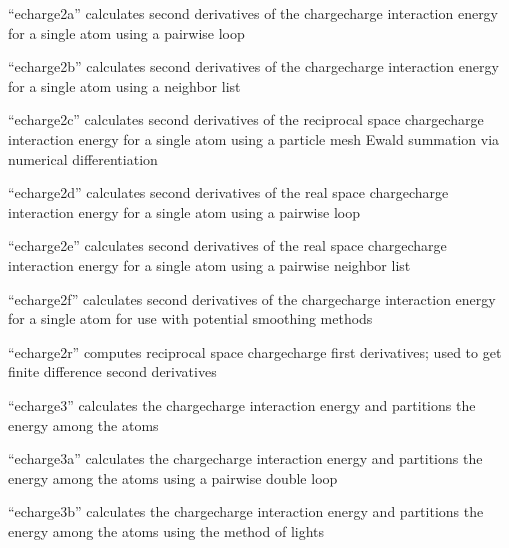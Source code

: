 \documentclass[letterpaper,11pt,english]{sphinxmanual}
\begin{document}
“echarge2a” calculates second derivatives of the charge\sphinxhyphen{}charge
interaction energy for a single atom using a pairwise loop


“echarge2b” calculates second derivatives of the charge\sphinxhyphen{}charge
interaction energy for a single atom using a neighbor list


“echarge2c” calculates second derivatives of the reciprocal
space charge\sphinxhyphen{}charge interaction energy for a single atom using
a particle mesh Ewald summation via numerical differentiation


“echarge2d” calculates second derivatives of the real space
charge\sphinxhyphen{}charge interaction energy for a single atom using a
pairwise loop


“echarge2e” calculates second derivatives of the real space
charge\sphinxhyphen{}charge interaction energy for a single atom using a
pairwise neighbor list


“echarge2f” calculates second derivatives of the charge\sphinxhyphen{}charge
interaction energy for a single atom for use with potential
smoothing methods


“echarge2r” computes reciprocal space charge\sphinxhyphen{}charge first
derivatives; used to get finite difference second derivatives


“echarge3” calculates the charge\sphinxhyphen{}charge interaction energy
and partitions the energy among the atoms


“echarge3a” calculates the charge\sphinxhyphen{}charge interaction energy
and partitions the energy among the atoms using a pairwise
double loop


“echarge3b” calculates the charge\sphinxhyphen{}charge interaction energy
and partitions the energy among the atoms using the method
of lights
\end{document}
